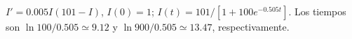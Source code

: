 $I'=0.005I(101-I)$, $I(0)=1$; $I(t)=101/[1+100e^{-0.505t}]$. Los tiempos son $\ln100/0.505\simeq9.12$ y $\ln900/0.505\simeq13.47$, respectivamente.
